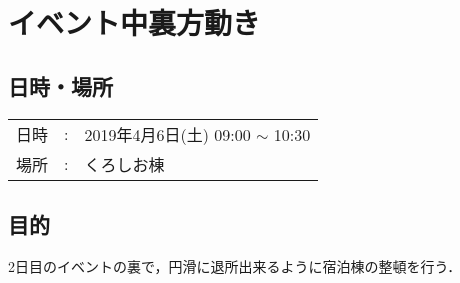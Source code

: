 %

\section{イベント中裏方動き}

\subsection{日時・場所}
\begin{tabular}{p{}rp{}}
  日時 & : & 2019年4月6日(土) 09:00 $\sim$ 10:30\\
  場所 & : & くろしお棟
\end{tabular}

\subsection{目的}
2日目のイベントの裏で，円滑に退所出来るように宿泊棟の整頓を行う．



